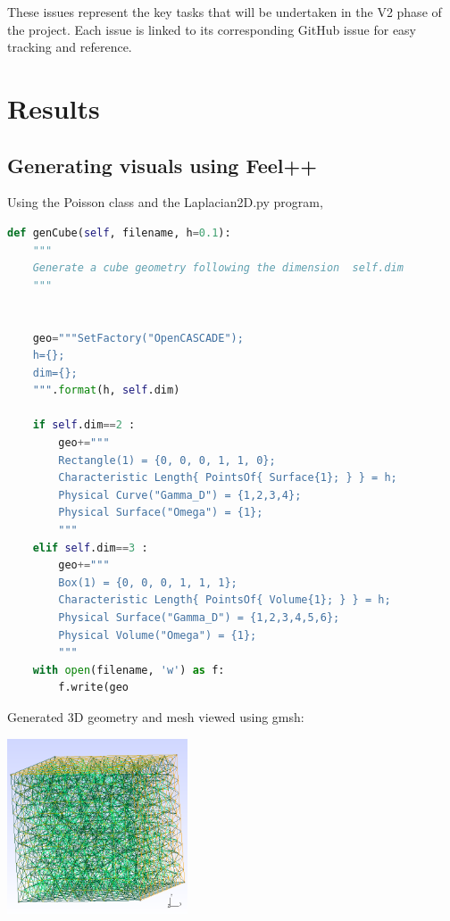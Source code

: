 \documentclass[12pt]{article}
\begin{document}
These issues represent the key tasks that will be undertaken in the V2 phase of the project. Each issue is linked to its corresponding GitHub issue for easy tracking and reference.

\newpage

\section{Results}
\subsection{Generating visuals using Feel++}

Using the Poisson class and the Laplacian2D.py program,


\begin{lstlisting}[language=Python,caption={},frame=single, backgroundcolor=\color{gray!10}, basicstyle=\footnotesize,rulecolor=\color{blue}, framexleftmargin=3pt, commentstyle=\color{mygreen}, keywordstyle=\color{blue}]
def genCube(self, filename, h=0.1):
    """
    Generate a cube geometry following the dimension  self.dim
    """

    
    geo="""SetFactory("OpenCASCADE");
    h={};
    dim={};
    """.format(h, self.dim)
    
    if self.dim==2 :
        geo+="""
        Rectangle(1) = {0, 0, 0, 1, 1, 0};
        Characteristic Length{ PointsOf{ Surface{1}; } } = h;
        Physical Curve("Gamma_D") = {1,2,3,4};
        Physical Surface("Omega") = {1};
        """
    elif self.dim==3 :
        geo+="""
        Box(1) = {0, 0, 0, 1, 1, 1};
        Characteristic Length{ PointsOf{ Volume{1}; } } = h;
        Physical Surface("Gamma_D") = {1,2,3,4,5,6};
        Physical Volume("Omega") = {1};
        """
    with open(filename, 'w') as f:
        f.write(geo
\end{lstlisting}

Generated 3D geometry and mesh viewed using gmsh:

\begin{frame}{}
        \includegraphics[width=0.4\textwidth]{images/fppmsh.png}
\end{frame}
\end{document}

